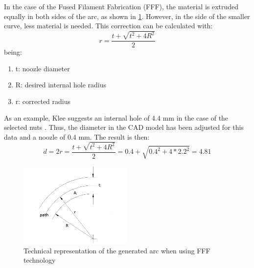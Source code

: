   In the case of the Fused Filament Fabrication (FFF), the material is extruded equally in both sides of the arc, as shown in \ref{fig:arc_compensation}. 
  However, in the side of the smaller curve, less material is needed.
  This correction can be calculated with:
  $$ r=\frac{t+\sqrt{t^2+4R^2}}{2}$$
  being:
  \begin{enumerate}
    \item t: noozle diameter
    \item R: desired internal hole radius
    \item r: corrected radius
  \end{enumerate}
  As an example, Klee suggests an internal hole of 4.4 mm in the case of the selected nuts \cite{klee}. Thus, the diameter in the CAD model has been adjusted for this data and a noozle of 0.4 mm. The result is then:
  $$ d=2r=\frac{t+\sqrt{t^2+4R^2}}{2}=0.4+\sqrt{0.4^2+4*2.2^2}=4.81$$

  \begin{figure}[tb]
    \centering
    \includegraphics[width=0.5\textwidth]{figures/Arc-compensation}
    \caption{Technical representation of the generated arc when using FFF technology}
    \label{fig:arc_compensation}
  \end{figure}


